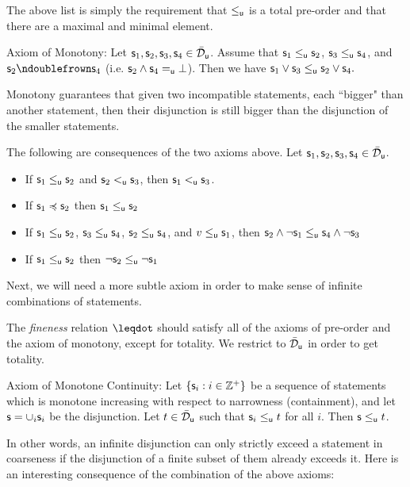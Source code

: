 \documentclass[11pt]{article}
\begin{document}
The above list is simply the requirement that $\leq_{\stmt[u]}$ is a total pre-order and that there are a maximal and minimal element. 


Axiom of Monotony: 
Let $\stmt_1,\stmt_2,\stmt_3,\stmt_4\in \tdomain_{\stmt[u]}$. Assume that $\stmt_1\leq_{\stmt[u]} \stmt_2$, $\stmt_3\leq_{\stmt[u]} \stmt_4$, and $\stmt_2\ncomp \stmt_4$ (i.e. $\stmt_2\AND \stmt_4 =_{\stmt[u]} \impossibility$). Then we have $\stmt_1\OR \stmt_3 \leq_{\stmt[u]} \stmt_2\OR \stmt_4.$

Monotony guarantees that given two incompatible statements, each ``bigger" than another statement, then their disjunction is still bigger than the disjunction of the smaller statements. 

The following are consequences of the two axioms above. Let $\stmt_1,\stmt_2,\stmt_3,\stmt_4\in \tdomain_{\stmt[u]}$.
\begin{itemize}
    \item If $\stmt_1\leq_{\stmt[u]} \stmt_2$ and $\stmt_2<_{\stmt[u]} \stmt_3$, then $\stmt_1<_{\stmt[u]}\stmt_3$. 
    \item If $\stmt_1\narrower \stmt_2$ then $\stmt_1\leq_{\stmt[u]} \stmt_2$
    \item If $\stmt_1\leq_{\stmt[u]} \stmt_2$, $\stmt_3\leq_{\stmt[u]} \stmt_4$, $\stmt_2\leq_{\stmt[u]} \stmt_4$, and $v\leq_{\stmt[u]} \stmt_1$, then $\stmt_2 \AND \NOT \stmt_1 \leq_{\stmt[u]} \stmt_4 \AND \NOT \stmt_3$
    \item If $\stmt_1\leq_{\stmt[u]} \stmt_2$ then $\NOT \stmt_2 \leq_{\stmt[u]}\NOT \stmt_1$
\end{itemize}

Next, we will need a more subtle axiom in order to make sense of infinite combinations of statements. 

\begin{remark}
The \emph{fineness} relation $\finer$ should satisfy all of the axioms of pre-order and the axiom of monotony, except for totality. We restrict to $\tdomain_{\stmt[u]}$ in order to get totality. 
\end{remark}

Axiom of Monotone Continuity:
Let $\{\stmt_i : i\in \mathbb{Z}^+\}$ be a sequence of statements which is monotone increasing with respect to narrowness (containment), and let $\stmt = \cup_i\stmt_i$ be the disjunction. Let $t\in \tdomain_{\stmt[u]}$ such that $\stmt_i\leq_{\stmt[u]} t$ for all $i$. Then $\stmt\leq_{\stmt[u]} t$. 

In other words, an infinite disjunction can only strictly exceed a statement in coarseness if the disjunction of a finite subset of them already exceeds it. Here is an interesting consequence of the combination of the above axioms:
\end{document}
